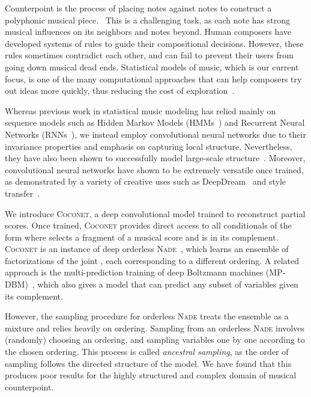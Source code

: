 \documentclass{article}
\newcommand{\coconet}{\textsc{Coconet}\xspace}
\newcommand{\nade}{\textsc{Nade}\xspace}
\begin{document}
Counterpoint is the process of placing notes against notes to construct a polyphonic musical piece.~\cite{fux1965study}  This is a challenging task, as each note has strong musical influences on its neighbors and notes beyond.
  Human composers have developed systems of rules to guide their compositional decisions.
However, these rules sometimes contradict each other, 
and can fail to prevent their users from going down musical dead ends.
Statistical models of music, which is our current focus, is one of the many computational approaches that can help composers try out ideas more quickly, thus reducing the cost of exploration~\cite{fernandez2013ai}.

Whereas previous work in statistical music modeling has relied mainly on sequence models such as
Hidden Markov Models (HMMs~\cite{baum1966statistical}) and
Recurrent Neural Networks (RNNs~\cite{rumelhart1988learning}),
we instead employ convolutional neural networks due to  their invariance properties and emphasis on capturing local structure.
Nevertheless, they have also been shown to successfully model large-scale structure~\cite{oord2016pixel,oord2016wavenet}.
Moreover, convolutional neural networks have shown to be extremely versatile once trained, as demonstrated by a variety of creative uses such as DeepDream~\cite{mordvintsev2015inceptionism} and style transfer~\cite{gatys2015neural}.

We introduce \coconet, a deep convolutional model trained to reconstruct partial scores.
Once trained, \coconet provides direct access to all conditionals of the form
 where
 selects a fragment of a musical score  and  is in its complement.  \coconet is an instance of deep orderless \nade~\cite{uria2014deep},
which learns an ensemble of factorizations of the joint , each corresponding to a different ordering.  
A related approach is the multi-prediction training of deep Boltzmann machines (MP-DBM)~\cite{goodfellow2013multi}, which also gives a model that can predict any subset of variables given its complement.

However, the sampling procedure for orderless \nade treats the ensemble as a mixture and relies heavily on ordering.
Sampling from an orderless \nade involves (randomly) choosing an ordering,
and sampling variables one by one according to the chosen ordering.
This process is called \emph{ancestral sampling}, as the order of sampling follows the directed structure of the model.
We have found that this produces poor results for the highly structured and complex domain of musical counterpoint.
\end{document}
